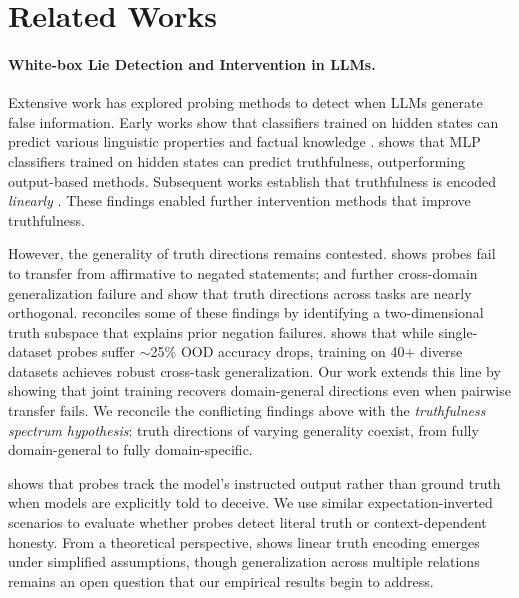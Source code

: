 \documentclass{article}
\theoremstyle{plain}
\theoremstyle{definition}
\theoremstyle{remark}
\begin{document}
\section{Related Works}

\paragraph{White-box Lie Detection and Intervention in LLMs.} 
Extensive work has explored probing methods to detect when LLMs generate false information. Early works show that classifiers trained on hidden states can predict various linguistic properties and factual knowledge \cite{petroni2019language, rogers2020primer, belinkov2022probing}. \citet{azaria2023internal} shows that MLP classifiers trained on hidden states can predict truthfulness, outperforming output-based methods.
Subsequent works establish that truthfulness is encoded \emph{linearly} \cite{marksgeometry, azaria2023internal, burns2023discovering, goldowsky2025detecting, bao2025probing, ravfogelemergence}. These findings enabled further intervention methods \citet{li2023inference, marksgeometry, zou2023representation, cundy2025train_against_probe} that improve truthfulness.

However, the generality of truth directions remains contested. \citet{levinstein2024still} shows probes fail to transfer from affirmative to negated statements; \citet{orgad2025llms} and \citet{azizian2025geometries} further cross-domain generalization failure and show that truth directions across tasks are nearly orthogonal. 
\citet{burger2024truth} reconciles some of these findings by identifying a two-dimensional truth subspace that explains prior negation failures. \citet{liu2024universal} shows that while single-dataset probes suffer $\sim$25\% OOD accuracy drops, training on 40+ diverse datasets achieves robust cross-task generalization. Our work extends this line by showing that joint training recovers domain-general directions even when pairwise transfer fails. We reconcile the conflicting findings above with the \emph{truthfulness spectrum hypothesis}: truth directions of varying generality coexist, from fully domain-general to fully domain-specific.

\citet{long2025truthful} shows that probes track the model's instructed output rather than ground truth when models are explicitly told to deceive. We use similar expectation-inverted scenarios to evaluate whether probes detect literal truth or context-dependent honesty. From a theoretical perspective, \citet{ravfogelemergence} shows linear truth encoding emerges under simplified assumptions, though generalization across multiple relations remains an open question that our empirical results begin to address. 
\end{document}
